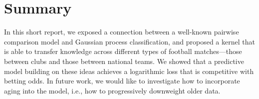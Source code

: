 \section{Summary}
\label{pk:sec:summary}

In this short report, we exposed a connection between a well-known pairwise comparison model and Gaussian process classification, and proposed a kernel that is able to transfer knowledge across different types of football matches---those between clubs and those between national teams.
We showed that a predictive model building on these ideas achieves a logarithmic loss that is competitive with betting odds.
In future work, we would like to investigate how to incorporate aging into the model, i.e., how to progressively downweight older data.
